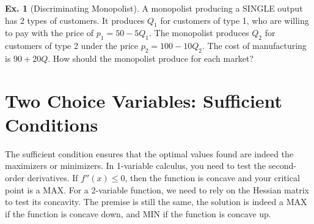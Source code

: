 \documentclass[10pt,a4paper]{book}
\theoremstyle{definition}\newtheorem{definition}{Definition}
\theoremstyle{definition}\newtheorem{fact}{Fact}
\theoremstyle{definition}\newtheorem{ex}{Ex.}
\theoremstyle{definition}\newtheorem{project}{Project}
\theoremstyle{definition}\newtheorem{problem}{Problem}
\theoremstyle{definition}\newtheorem{example}{Example}
\numberwithin{theorem}{chapter}
\numberwithin{corollary}{chapter}
\numberwithin{assumption}{chapter}
\numberwithin{definition}{chapter}
\numberwithin{prop}{chapter}
\numberwithin{notation}{chapter}
\numberwithin{problem}{chapter}
\numberwithin{example}{chapter}
\numberwithin{fact}{chapter}
\numberwithin{ex}{chapter}
\def\x{\mathbf x}
\begin{document}
	\begin{ex}[Discriminating Monopolist]
		A monopolist producing a SINGLE output has 2 types of customers. It produces $Q_1$ for customers of type 1, who are willing to pay with the price of $p_1 = 50 - 5Q_1$. The monopolist produces $Q_2$ for customers of type 2 under the price $p_2 = 100 - 10 Q_2$. The cost of manufacturing is $90+20Q$. How should the monopolist produce for each market?
	\end{ex}
	
	\section{Two Choice Variables: Sufficient Conditions}
	
	The sufficient condition ensures that the optimal values found are indeed the maximizers or minimizers. In 1-variable calculus, you need to test the second-order derivatives. If $f''(x)\leq 0$, then the function is concave and your critical point is a MAX. For a 2-variable function, we need to rely on the Hessian matrix to test its concavity. The premise is still the same, the solution is indeed a MAX if the function is concave down, and MIN if the function is concave up.
	
	
\end{document}
